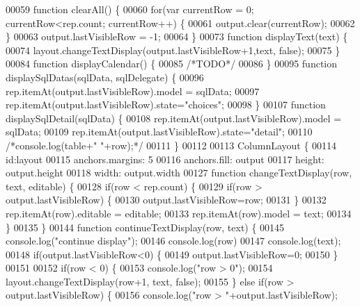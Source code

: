 \begin{DoxyCode}
00059     \textcolor{keyword}{function} clearAll() \{
00060         \textcolor{keywordflow}{for}(var currentRow = 0; currentRow<rep.count; currentRow++) \{
00061             output.clear(currentRow);
00062         \}
00063         output.lastVisibleRow = -1;
00064     \}
00073     \textcolor{keyword}{function} displayText(text) \{
00074         layout.changeTextDisplay(output.lastVisibleRow+1,text, \textcolor{keyword}{false});
00075     \}
00084     \textcolor{keyword}{function} displayCalendar() \{
00085         \textcolor{comment}{/*TODO*/}
00086     \}
00095     \textcolor{keyword}{function} displaySqlDatas(sqlData, sqlDelegate) \{
00096         rep.itemAt(output.lastVisibleRow).model = sqlData;
00097         rep.itemAt(output.lastVisibleRow).state=\textcolor{stringliteral}{"choices"};
00098     \}
00107     \textcolor{keyword}{function} displaySqlDetail(sqlData) \{
00108         rep.itemAt(output.lastVisibleRow).model = sqlData;
00109         rep.itemAt(output.lastVisibleRow).state=\textcolor{stringliteral}{"detail"};
00110         \textcolor{comment}{/*console.log(table+" "+row);*/}
00111     \}
00112 
00113     ColumnLayout \{
00114         \textcolor{keywordtype}{id}:layout
00115         anchors.margins: 5
00116         anchors.fill: output
00117         height: output.height
00118         width: output.width
00127         \textcolor{keyword}{function} changeTextDisplay(row, text, editable) \{
00128             \textcolor{keywordflow}{if}(row < rep.count) \{
00129                 \textcolor{keywordflow}{if}(row > output.lastVisibleRow) \{
00130                     output.lastVisibleRow=row;
00131                 \}
00132                 rep.itemAt(row).editable = editable;
00133                 rep.itemAt(row).model = text;
00134             \}
00135         \}
00144         \textcolor{keyword}{function} continueTextDisplay(row, text) \{
00145             console.log(\textcolor{stringliteral}{"continue display"});
00146             console.log(row)
00147             console.log(text);
00148             \textcolor{keywordflow}{if}(output.lastVisibleRow<0) \{
00149                 output.lastVisibleRow=0;
00150             \}
00151 
00152             \textcolor{keywordflow}{if}(row < 0) \{
00153                 console.log(\textcolor{stringliteral}{"row > 0"});
00154                 layout.changeTextDisplay(row+1, text, \textcolor{keyword}{false});
00155             \} \textcolor{keywordflow}{else} \textcolor{keywordflow}{if}(row > output.lastVisibleRow) \{
00156                 console.log(\textcolor{stringliteral}{"row > "}+output.lastVisibleRow);

\end{DoxyCode}
